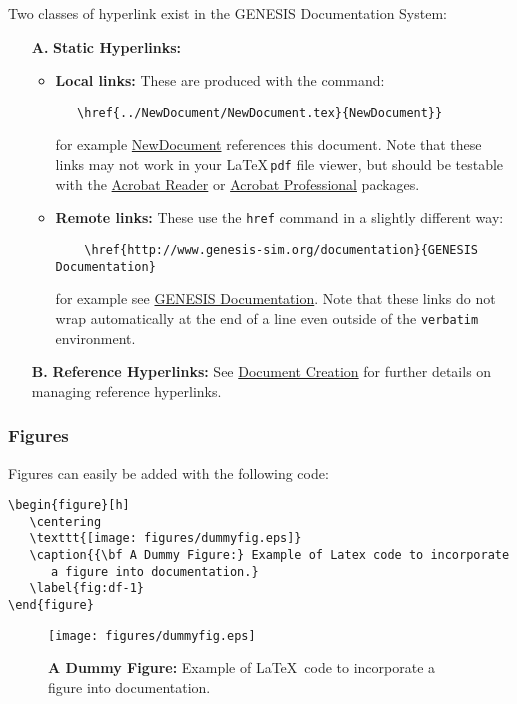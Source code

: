 \documentclass[12pt]{article}
\begin{document}
Two classes of hyperlink exist in the GENESIS Documentation System:

\begin{itemize}
\item[{\bf A.}]{\bf Static Hyperlinks:} 
   \begin{itemize}
      \item{\bf Local links:} These are produced with the command:
\begin{verbatim}
   \href{../NewDocument/NewDocument.tex}{NewDocument}}
\end{verbatim}
for example \href{../NewDocument/NewDocument.tex}{NewDocument} references this document.
Note that these links may not work in your \LaTeX\,{\tt pdf} file viewer, but should be testable with the \href{http://get.adobe.com/reader/}{Acrobat Reader} or \href{http://www.adobe.com/products/acrobatpro/tryout.html}{Acrobat Professional} packages.
      \item {\bf Remote links:} These use the {\tt href} command in a slightly different way:
\begin{verbatim}
    \href{http://www.genesis-sim.org/documentation}{GENESIS Documentation}
\end{verbatim}
for example see \href{http://www.genesis-sim.org/documentation}{GENESIS Documentation}. Note that these links do not wrap automatically at the end of a line even outside of the {\tt verbatim} environment.
\end{itemize}

\item[{\bf B.}]{\bf Reference Hyperlinks:} See \href{../document-create/document-create.tex}{Document Creation} for further details on managing reference hyperlinks.

\end{itemize}

\subsubsection*{Figures}

Figures can easily be added with the following code:

\begin{verbatim}
\begin{figure}[h]
   \centering
   \texttt{[image: figures/dummyfig.eps]}
   \caption{{\bf A Dummy Figure:} Example of Latex code to incorporate
      a figure into documentation.}
   \label{fig:df-1}
\end{figure}
\end{verbatim}

\begin{figure}[h]
  \centering
   \texttt{[image: figures/dummyfig.eps]}
\caption{{\bf A Dummy Figure:} Example of \LaTeX\,\,\,code to incorporate a figure into documentation.}
  \label{fig:df-2}
\end{figure}
\end{document}
